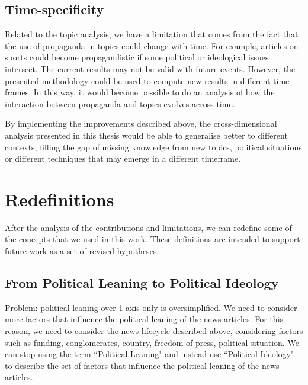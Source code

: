 \subsection{Time-specificity}
Related to the topic analysis, we have a limitation that comes from the fact that the use of propaganda in topics could change with time. %
For example, articles on sports could become propagandistic if some political or ideological issues intersect. %
The current results may not be valid with future events.
However, the presented methodology could be used to compute new results in different time frames.
In this way, it would become possible to do an analysis of how the interaction between propaganda and topics evolves across time.


By implementing the improvements described above, the cross-dimensional analysis presented in this thesis would be able to generalise better to different contexts, filling the gap of missing knowledge from new topics, political situations or different techniques that may emerge in a different timeframe.



\section{Redefinitions}


After the analysis of the contributions and limitations, we can redefine some of the concepts that we used in this work. These definitions are intended to support future work as a set of revised hypotheses.


\subsection{From Political Leaning to Political Ideology}

Problem: political leaning over 1 axis only is oversimplified. We need to consider more factors that influence the political leaning of the news articles.
For this reason, we need to consider the news lifecycle described above, considering factors such as funding, conglomerates, country, freedom of press, political situation.
We can stop using the term ``Political Leaning" and instead use ``Political Ideology" to describe the set of factors that influence the political leaning of the news articles.

